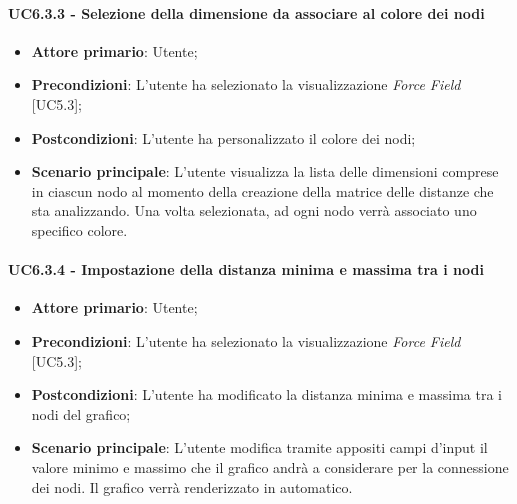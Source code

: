 \paragraph{UC6.3.3 - Selezione della dimensione da associare al colore dei nodi}
\begin{itemize}
	\item \textbf{Attore primario}: Utente;
	\item \textbf{Precondizioni}: L'utente ha selezionato la visualizzazione \textit{Force Field} [UC5.3];
	\item \textbf{Postcondizioni}: L'utente ha personalizzato il colore dei nodi;
	
	\item \textbf{Scenario principale}: L'utente visualizza la lista delle dimensioni comprese in ciascun nodo al momento della creazione della matrice delle distanze che sta analizzando. Una volta selezionata, ad ogni nodo verrà associato uno specifico colore.
\end{itemize}

\paragraph{UC6.3.4 - Impostazione della distanza minima e massima tra i nodi}
\begin{itemize}
	\item \textbf{Attore primario}: Utente;
	\item \textbf{Precondizioni}: L'utente ha selezionato la visualizzazione \textit{Force Field} [UC5.3];
	\item \textbf{Postcondizioni}: L'utente ha modificato la distanza minima e massima tra i nodi del grafico;
	
	\item \textbf{Scenario principale}: L'utente modifica tramite appositi campi d'input il valore minimo e massimo che il grafico andrà a considerare per la connessione dei nodi. Il grafico verrà renderizzato in automatico.
\end{itemize}



